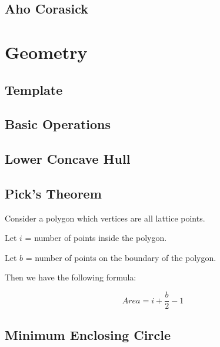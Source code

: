 \documentclass[a4paper,10pt,twocolumn,oneside]{article}
\begin{document}
\subsection{Aho Corasick}







\section{Geometry}

\subsection{Template}


\subsection{Basic Operations}







\subsection{Lower Concave Hull}


\subsection{Pick's Theorem}
Consider a polygon which vertices are all lattice points.

Let $i$ = number of points inside the polygon.

Let $b$ = number of points on the boundary of the polygon.

Then we have the following formula:

$$
Area = i + \frac{b}{2} - 1
$$

\subsection{Minimum Enclosing Circle}


% 
\end{document}
